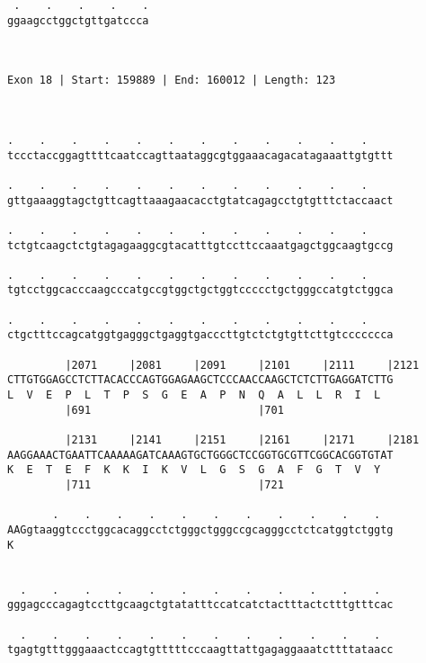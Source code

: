 \documentclass{article}
\begin{document}
\begin{Verbatim}
 .    .    .    .    .
ggaagcctggctgttgatccca
                      
                      
 
Exon 18 | Start: 159889 | End: 160012 | Length: 123



.    .    .    .    .    .    .    .    .    .    .    .    
tccctaccggagttttcaatccagttaataggcgtggaaacagacatagaaattgtgttt
                                                            
.    .    .    .    .    .    .    .    .    .    .    .    
gttgaaaggtagctgttcagttaaagaacacctgtatcagagcctgtgtttctaccaact
                                                            
.    .    .    .    .    .    .    .    .    .    .    .    
tctgtcaagctctgtagagaaggcgtacatttgtccttccaaatgagctggcaagtgccg
                                                            
.    .    .    .    .    .    .    .    .    .    .    .    
tgtcctggcacccaagcccatgccgtggctgctggtccccctgctgggccatgtctggca
                                                            
.    .    .    .    .    .    .    .    .    .    .    .    
ctgctttccagcatggtgagggctgaggtgacccttgtctctgtgttcttgtccccccca
                                                            
         |2071     |2081     |2091     |2101     |2111     |2121
CTTGTGGAGCCTCTTACACCCAGTGGAGAAGCTCCCAACCAAGCTCTCTTGAGGATCTTG
L  V  E  P  L  T  P  S  G  E  A  P  N  Q  A  L  L  R  I  L  
         |691                          |701                 
  
         |2131     |2141     |2151     |2161     |2171     |2181
AAGGAAACTGAATTCAAAAAGATCAAAGTGCTGGGCTCCGGTGCGTTCGGCACGGTGTAT
K  E  T  E  F  K  K  I  K  V  L  G  S  G  A  F  G  T  V  Y  
         |711                          |721                 
  
       .    .    .    .    .    .    .    .    .    .    .  
AAGgtaaggtccctggcacaggcctctgggctgggccgcagggcctctcatggtctggtg
K                                                           
                                                            
  
  .    .    .    .    .    .    .    .    .    .    .    .  
gggagcccagagtccttgcaagctgtatatttccatcatctactttactctttgtttcac
                                                            
  .    .    .    .    .    .    .    .    .    .    .    .  
tgagtgtttgggaaactccagtgtttttcccaagttattgagaggaaatcttttataacc
                                                            

\end{Verbatim}
\end{document}
